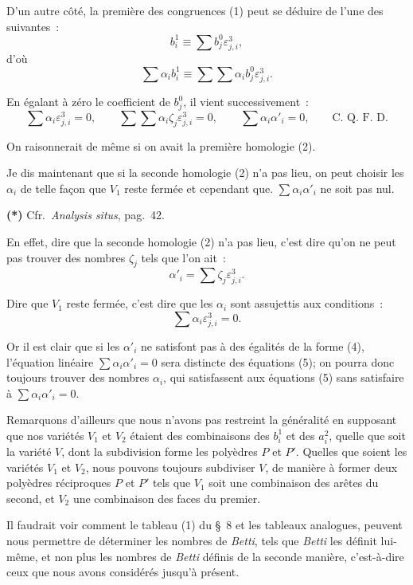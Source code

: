 \documentclass{article}
\begin{document}
D'un autre côté, la première des congruences (1) peut se déduire de l'une des suivantes~:
\[ b^{1}_{i} \equiv \sum b^{0}_{j} \varepsilon^{3}_{j,i}, \tag{3} \]
d'où
\[ \sum \alpha_{i} b^{1}_{i} \equiv \sum \sum \alpha_{i} b^{0}_{j} \varepsilon^{3}_{j,i}. \]

En égalant à zéro le coefficient de $b^{0}_{j}$, il vient successivement~:
\[ \sum \alpha_{i} \varepsilon^{3}_{j,i} = 0, \qquad \sum \sum \alpha_{i} \zeta_{j} \varepsilon^{3}_{j,i} = 0, \qquad \sum \alpha_{i} \alpha'_{i} = 0, \qquad \text{C.~Q.~F.~D.} \]

On raisonnerait de même si on avait la première homologie (2).

Je dis maintenant que si la seconde homologie (2) n'a pas lieu, on peut choisir les $\alpha_{i}$ de telle façon que $V_{1}$ reste fermée et cependant que. $\displaystyle\sum \alpha_{i} \alpha'_{i}$ ne soit pas nul.

\textbf{(*)} Cfr.\ \emph{Analysis situs}, pag.\ 42.

En effet, dire que la seconde homologie (2) n'a pas lieu, c'est
dire qu'on ne peut pas trouver des nombres $\zeta_{j}$ tels que l'on ait~:
\[ \alpha'_{i} = \sum \zeta_{j} \varepsilon^{3}_{j,i}. \tag{4} \]

Dire que $V_{1}$ reste fermée, c'est dire que les $\alpha_{i}$ sont assujettis aux conditions~:
\[ \sum \alpha_{i} \varepsilon^{3}_{j,i} = 0. \tag{5} \]

Or il est clair que si les $\alpha'_{i}$ ne satisfont pas à des égalités de la forme (4), l'équation linéaire $\displaystyle\sum \alpha_{i} \alpha'_{i} = 0$ sera distincte des équations (5); on pourra donc toujours trouver des nombres $\alpha_{i}$, qui satisfassent aux équations (5) sans satisfaire à $\displaystyle\sum \alpha_{i} \alpha'_{i} = 0$.

Remarquons d'ailleurs que nous n'avons pas restreint la généralité en supposant que nos variétés $V_{1}$ et $V_{2}$ étaient des combinaisons des $b^{1}_{i}$ et des $a^{2}_{i}$, quelle que soit la variété $V$, dont la subdivision forme les polyèdres $P$ et $P'$. Quelles que soient les variétés $V_{1}$ et $V_{2}$, nous pouvons toujours subdiviser $V$, de manière à former deux polyèdres réciproques $P$ et $P'$ tels que $V_{1}$ soit une combinaison des arêtes du second, et $V_{2}$ une combinaison des faces du premier.

Il faudrait voir comment le tableau (1) du \S~8 et les tableaux analogues, peuvent nous permettre de déterminer les nombres de \emph{Betti}, tels que \emph{Betti} les définit lui-même, et non plus les nombres de \emph{Betti} définis de la seconde manière, c'est-à-dire ceux que nous avons considérés jusqu'à présent.
\end{document}
